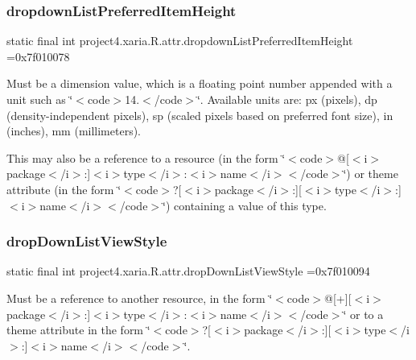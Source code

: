 \subsubsection{\texorpdfstring{dropdown\+List\+Preferred\+Item\+Height}{dropdownListPreferredItemHeight}}
{\footnotesize\ttfamily static final int project4.\+xaria.\+R.\+attr.\+dropdown\+List\+Preferred\+Item\+Height =0x7f010078\hspace{0.3cm}{\ttfamily [static]}}

Must be a dimension value, which is a floating point number appended with a unit such as \char`\"{}$<$code$>$14.\+5sp$<$/code$>$\char`\"{}. Available units are\+: px (pixels), dp (density-\/independent pixels), sp (scaled pixels based on preferred font size), in (inches), mm (millimeters). 

This may also be a reference to a resource (in the form \char`\"{}$<$code$>$@\mbox{[}$<$i$>$package$<$/i$>$\+:\mbox{]}$<$i$>$type$<$/i$>$\+:$<$i$>$name$<$/i$>$$<$/code$>$\char`\"{}) or theme attribute (in the form \char`\"{}$<$code$>$?\mbox{[}$<$i$>$package$<$/i$>$\+:\mbox{]}\mbox{[}$<$i$>$type$<$/i$>$\+:\mbox{]}$<$i$>$name$<$/i$>$$<$/code$>$\char`\"{}) containing a value of this type. \mbox{\label{classproject4_1_1xaria_1_1R_1_1attr_ad63e65ddbc7cce36f753b749495b3631}} 
\subsubsection{\texorpdfstring{drop\+Down\+List\+View\+Style}{dropDownListViewStyle}}
{\footnotesize\ttfamily static final int project4.\+xaria.\+R.\+attr.\+drop\+Down\+List\+View\+Style =0x7f010094\hspace{0.3cm}{\ttfamily [static]}}

Must be a reference to another resource, in the form \char`\"{}$<$code$>$@\mbox{[}+\mbox{]}\mbox{[}$<$i$>$package$<$/i$>$\+:\mbox{]}$<$i$>$type$<$/i$>$\+:$<$i$>$name$<$/i$>$$<$/code$>$\char`\"{} or to a theme attribute in the form \char`\"{}$<$code$>$?\mbox{[}$<$i$>$package$<$/i$>$\+:\mbox{]}\mbox{[}$<$i$>$type$<$/i$>$\+:\mbox{]}$<$i$>$name$<$/i$>$$<$/code$>$\char`\"{}. \mbox{\label{classproject4_1_1xaria_1_1R_1_1attr_a2ba4243073405f6dcd8b6efe82890258}} 
